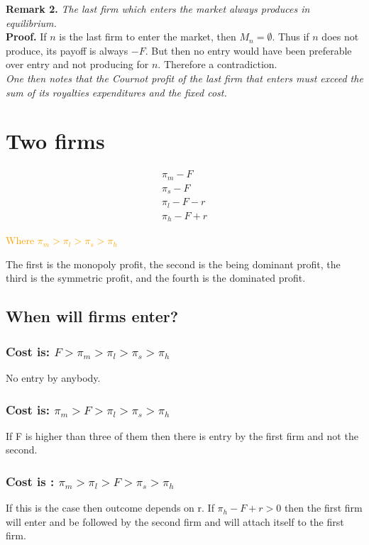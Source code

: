 \documentclass{article}
\begin{document}
\textbf{Remark 2.} \textit{The last firm which enters the market always produces in equilibrium.}\\

\indent \textbf{Proof.} If $n$ is the last firm to enter the market, then $M_n=\emptyset$. Thus if $n$ does not produce, its payoff is always $-F$. But then no entry would have been preferable over entry and not producing for $n$. Therefore a contradiction. \\
\indent \textit{One then notes that the Cournot profit of the last firm that enters must exceed the sum of its royalties expenditures and the fixed cost. }
\section{Two firms}

\begin{align*}
    \pi_m -F \\
    \pi_s -F \\ 
    \pi_l -F -r \\
    \pi_h -F +r 
\end{align*}

\textcolor{orange}{Where $\pi_m>\pi_l>\pi_s>\pi_h$ }

The first is the monopoly profit, the second is the being dominant profit, the third is the symmetric profit, and the fourth is the dominated profit. 

\subsection{When will firms enter?}

\subsubsection*{ Cost is: $F> \pi_m>\pi_l>\pi_s>\pi_h$}
No entry by anybody.

\subsubsection*{Cost is: $\pi_m>F>\pi_l>\pi_s>\pi_h$}
If F is higher than three of them then there is entry by the first firm and not the second.

\subsubsection*{Cost is : $\pi_m>\pi_l>F>\pi_s>\pi_h$}
If this is the case then outcome depends on r. 
If $\pi_h -F+r>0$ then the first firm will enter and be followed by the second firm and will attach itself to the first firm. 
\end{document}
